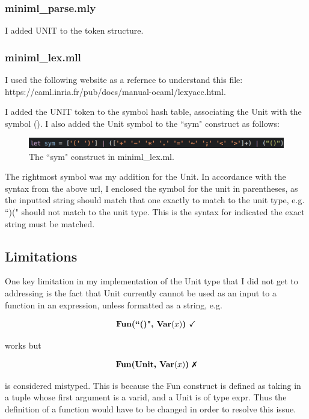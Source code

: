 \documentclass{article}
\newcommand{\xmark}{\ding{55}}%
\begin{document}
\subsubsection{miniml\_parse.mly}
I added UNIT to the token structure. 

\subsubsection{miniml\_lex.mll}
I used the following website as a refernce to understand this file: \\
https://caml.inria.fr/pub/docs/manual-ocaml/lexyacc.html. 

I added the UNIT token to the symbol hash table, associating the Unit with the symbol (). I also added the Unit symbol to the ``sym" construct as follows:

\begin{figure}[h]
\begin{center}
\includegraphics[width=.7\textwidth]{sym.png}
\end{center}
\caption{The ``sym" construct in miniml\_lex.ml.}
\end{figure}

The rightmost symbol was my addition for the Unit. In accordance with the syntax from the above url, I enclosed the symbol for the unit in parentheses, as the inputted string should match that one exactly to match to the unit type, e.g. ``)(" should not match to the unit type. This is the syntax for indicated the exact string must be matched.

\subsection{Limitations}
One key limitation in my implementation of the Unit type that I did not get to addressing is the fact that Unit currently cannot be used as an input to a function in an expression, unless formatted as a string, e.g.

$$\textbf{Fun(``()", Var}(x)\textbf{)  \checkmark} $$

works but

$$\textbf{Fun(Unit, Var}(x)\textbf{)  \xmark}$$

is considered mistyped. This is because the Fun construct is defined as taking in a tuple whose first argument is a varid, and a Unit is of type expr. Thus the definition of a function would have to be changed in order to resolve this issue.
\end{document}
